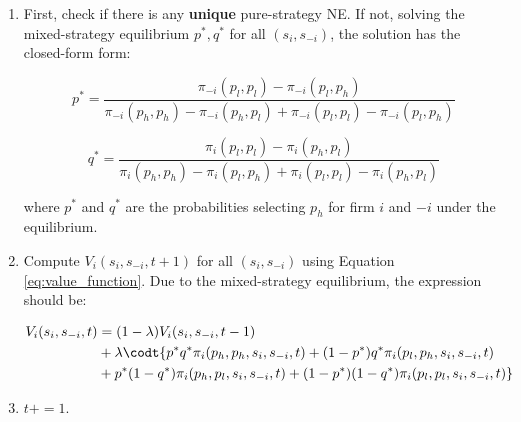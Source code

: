 \documentclass[12pt,letterpaper]{article}
\begin{document}
\begin{enumerate}
\begin{enumerate}
        \begin{table}[h]
            \centering
            \begin{tabular}{|c|c|c|}
                \hline
                \textbf{Firm $i$} / \textbf{Firm $-i$} & $p_h$ & $p_l$ \\
                \hline
                $p_h$ & $\pi_i(p_h,p_h), \pi_{-i}(p_h,p_h)$ & $\pi_i(p_h,p_l), \pi_{-i}(p_h,p_l)$ \\
                \hline
                $p_l$ & $\pi_i(p_l,p_h), \pi_{-i}(p_l, p_h)$ & $\pi_i(p_l,p_l), \pi_{-i}(p_l,p_l)$ \\
                \hline
            \end{tabular}
            \caption{Payoff Matrix given $s_i,s_{-i}, t$}
            \label{tab:payoff1}
        \end{table}
        
        where the payoff is defined by Equations \ref{eq:revenue_pair};
        \item First, check if there is any \textbf{unique} pure-strategy NE. If not, solving the mixed-strategy equilibrium $p^*, q^*$ for all $(s_i, s_{-i})$, the solution has the closed-form form:

        \[
            p^* = \frac{\pi_{-i}(p_l,p_l)-\pi_{-i}(p_l,p_h)}{\pi_{-i}(p_h,p_h)-\pi_{-i}(p_h,p_l)+\pi_{-i}(p_l,p_l)-\pi_{-i}(p_l,p_h)}
        \]
        
        \begin{equation}\label{eq:solutions}
            q^* = \frac{\pi_{i}(p_l,p_l)-\pi_{i}(p_h,p_l)}{\pi_{i}(p_h,p_h)-\pi_{i}(p_l,p_h)+\pi_{i}(p_l,p_l)-\pi_{i}(p_h,p_l)}
        \end{equation}
        
        where $p^*$ and $q^*$ are the probabilities selecting $p_h$ for firm $i$ and $-i$ under the equilibrium.
        \item Compute $V_i(s_i, s_{-i}, t+1)$ for all $(s_i, s_{-i})$ using Equation \ref{eq:value_function}. Due to the mixed-strategy equilibrium, the expression should be:

        \[
            \begin{align}
                V_i(s_i,s_{-i},t) & = (1-\lambda)V_i(s_i,s_{-i},t-1) \\
                & + \lambda \codt \{p^* q^* \pi_i(p_h,p_h,s_i,s_{-i},t) + (1-p^*)q^* \pi_i(p_l,p_h,s_i,s_{-i},t) \\
                & + p^*(1-q^*) \pi_i(p_h,p_l,s_i,s_{-i},t) + (1-p^*)(1-q^*) \pi_i(p_l,p_l,s_i,s_{-i},t) \}
            \end{align}
        \]
        \item $t+=1$.
    \end{enumerate}
\end{enumerate}
\end{document}
